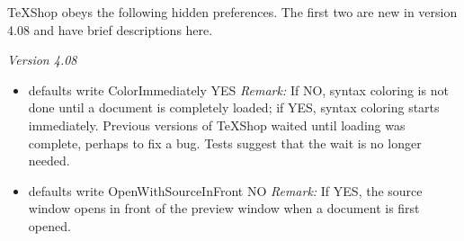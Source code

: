 \documentclass[11pt, oneside]{article}   	%
\begin{document}
TeXShop obeys the following hidden preferences. The first two are new in version 4.08 and have brief descriptions here.

{\em Version 4.08}
\begin{itemize}
\item defaults write ColorImmediately YES \newline \newline
{\em Remark:} If NO, syntax coloring is not done until a document is completely loaded; if YES, syntax coloring starts immediately. Previous versions of TeXShop waited until loading was complete, perhaps to fix a bug. Tests suggest that the wait is no longer needed. \newline
\item defaults write OpenWithSourceInFront NO \newline \newline
{\em Remark:}  If YES, the source window opens in front of the preview window when a document is first opened. \newline
\end{itemize}
\end{document}
